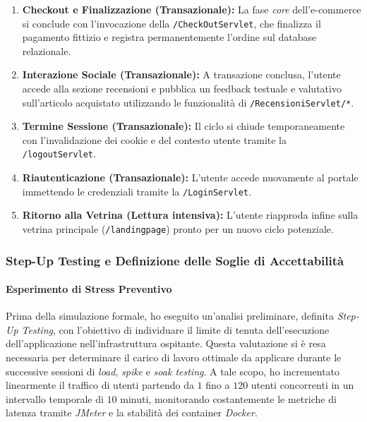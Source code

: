 \begin{enumerate}
    \item \textbf{Checkout e Finalizzazione (Transazionale):} La fase \textit{core} dell'e-commerce si conclude con l'invocazione della \texttt{/CheckOutServlet}, che finalizza il pagamento fittizio e registra permanentemente l'ordine sul database relazionale.
    \item \textbf{Interazione Sociale (Transazionale):} A transazione conclusa, l'utente accede alla sezione recensioni e pubblica un feedback testuale e valutativo sull'articolo acquistato utilizzando le funzionalità di \texttt{/RecensioniServlet/*}.
    \item \textbf{Termine Sessione (Transazionale):} Il ciclo si chiude temporaneamente con l'invalidazione dei cookie e del contesto utente tramite la \texttt{/logoutServlet}.
    \item \textbf{Riautenticazione (Transazionale):} L'utente accede nuovamente al portale immettendo le credenziali tramite la \texttt{/LoginServlet}.
    \item \textbf{Ritorno alla Vetrina (Lettura intensiva):} L'utente riapproda infine sulla vetrina principale (\texttt{/landingpage}) pronto per un nuovo ciclo potenziale.
\end{enumerate}

\subsubsection{Step-Up Testing e Definizione delle Soglie di Accettabilità}

\paragraph{Esperimento di Stress Preventivo}
Prima della simulazione formale, ho eseguito un'analisi preliminare, definita \textit{Step-Up Testing}, con l'obiettivo di individuare il limite di tenuta dell'esecuzione dell'applicazione nell'infrastruttura ospitante. Questa valutazione si è resa necessaria per determinare il carico di lavoro ottimale da applicare durante le successive sessioni di \textit{load}, \textit{spike} e \textit{soak testing}. A tale scopo, ho incrementato linearmente il traffico di utenti partendo da $1$ fino a $120$ utenti concorrenti in un intervallo temporale di $10$ minuti, monitorando costantemente le metriche di latenza tramite \textit{JMeter} e la stabilità dei container \textit{Docker}.


